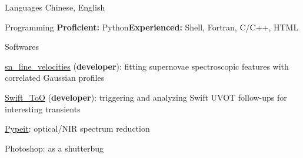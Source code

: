 


\begin{cvskills}


\cvskill
{Languages} %
{Chinese, English} %


\cvskill
{Programming} %
{\textbf{Proficient:} Python\quad \textbf{Experienced:} Shell, Fortran, C/C++, HTML} %



\cvskill
{Softwares} %
{\begin{cvitems}
    \item {\href{https://github.com/slowdivePTG/sn_line_velocities}{sn\_line\_velocities} (\textbf{developer}): fitting supernovae spectroscopic features with correlated Gaussian profiles}
    \item {\href{https://github.com/slowdivePTG/Swift_ToO}{Swift\_ToO} (\textbf{developer}): triggering and analyzing Swift UVOT follow-ups for interesting transients}
    \item \href{https://pypeit.readthedocs.io/en/release/}{Pypeit}: optical/NIR spectrum reduction
    \item Photoshop: as a shutterbug
\end{cvitems}}%

\end{cvskills}